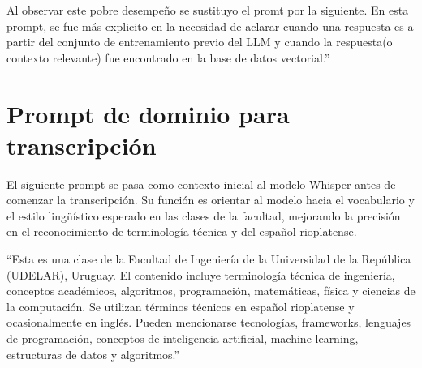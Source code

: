 Al observar este pobre desempeño se sustituyo el promt por la siguiente. En esta prompt, se fue más explicito en la necesidad de aclarar cuando una respuesta es a partir del conjunto de entrenamiento previo del LLM y cuando la respuesta(o contexto relevante) fue encontrado en la base de datos vectorial.''


\section{Prompt de dominio para transcripción}
\label{section:A-1-prompt-transcripcion}
El siguiente prompt se pasa como contexto inicial al modelo Whisper antes de comenzar la transcripción. Su función es orientar al modelo hacia el vocabulario y el estilo lingüístico esperado en las clases de la facultad, mejorando la precisión en el reconocimiento de terminología técnica y del español rioplatense.

\begin{itshape}
``Esta es una clase de la Facultad de Ingeniería de la Universidad de la República (UDELAR), Uruguay.
El contenido incluye terminología técnica de ingeniería, conceptos académicos, algoritmos,
programación, matemáticas, física y ciencias de la computación.
Se utilizan términos técnicos en español rioplatense y ocasionalmente en inglés.
Pueden mencionarse tecnologías, frameworks, lenguajes de programación,
conceptos de inteligencia artificial, machine learning, estructuras de datos y algoritmos.''
\end{itshape}






